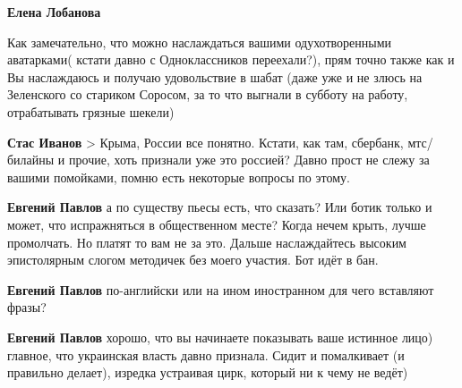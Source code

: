 \begin{itemize}
\begin{itemize}
 
\textbf{Елена Лобанова} 

Как замечательно, что можно наслаждаться вашими одухотворенными аватарками(
кстати давно с Одноклассников переехали?), прям точно также как и Вы
наслаждаюсь и получаю удовольствие в шабат (даже уже и не злюсь на Зеленского
со стариком Соросом, за то что выгнали в субботу на работу, отрабатывать
грязные шекели)

 
\textbf{Стас Иванов} > Крыма, России все понятно. Кстати, как там, сбербанк,
мтс/билайны и прочие, хоть признали уже это россией? Давно прост не слежу за
вашими помойками, помню есть некоторые вопросы по этому.

 
\textbf{Евгений Павлов} а по существу пьесы есть, что сказать? Или ботик только и может, что испражняться в общественном месте? Когда нечем крыть, лучше промолчать. Но платят то вам не за это. Дальше наслаждайтесь высоким эпистолярным слогом методичек без моего участия. Бот идёт в бан.

 
\textbf{Евгений Павлов} по-английски или на ином иностранном для чего вставляют фразы?

 
\textbf{Евгений Павлов} хорошо, что вы начинаете показывать ваше истинное лицо) главное, что украинская власть давно признала. Сидит и помалкивает (и правильно делает), изредка устраивая цирк, который ни к чему не ведёт)


\end{itemize}
\end{itemize}
